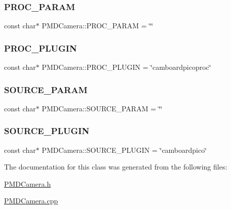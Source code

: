 \subsubsection{\texorpdfstring{P\+R\+O\+C\+\_\+\+P\+A\+R\+AM}{PROC\_PARAM}}
{\footnotesize\ttfamily const char$\ast$ P\+M\+D\+Camera\+::\+P\+R\+O\+C\+\_\+\+P\+A\+R\+AM = \char`\"{}\char`\"{}\hspace{0.3cm}{\ttfamily [private]}}

\hypertarget{class_p_m_d_camera_a1f03b40bf2336e61879fc909490f2829}{}\label{class_p_m_d_camera_a1f03b40bf2336e61879fc909490f2829} 
\subsubsection{\texorpdfstring{P\+R\+O\+C\+\_\+\+P\+L\+U\+G\+IN}{PROC\_PLUGIN}}
{\footnotesize\ttfamily const char$\ast$ P\+M\+D\+Camera\+::\+P\+R\+O\+C\+\_\+\+P\+L\+U\+G\+IN = \char`\"{}camboardpicoproc\char`\"{}\hspace{0.3cm}{\ttfamily [private]}}

\hypertarget{class_p_m_d_camera_a439b2e8f27acbc26d4de70d9f8a82386}{}\label{class_p_m_d_camera_a439b2e8f27acbc26d4de70d9f8a82386} 
\subsubsection{\texorpdfstring{S\+O\+U\+R\+C\+E\+\_\+\+P\+A\+R\+AM}{SOURCE\_PARAM}}
{\footnotesize\ttfamily const char$\ast$ P\+M\+D\+Camera\+::\+S\+O\+U\+R\+C\+E\+\_\+\+P\+A\+R\+AM = \char`\"{}\char`\"{}\hspace{0.3cm}{\ttfamily [private]}}

\hypertarget{class_p_m_d_camera_ae5c857a614ea51781c690fd862f0e7a2}{}\label{class_p_m_d_camera_ae5c857a614ea51781c690fd862f0e7a2} 
\subsubsection{\texorpdfstring{S\+O\+U\+R\+C\+E\+\_\+\+P\+L\+U\+G\+IN}{SOURCE\_PLUGIN}}
{\footnotesize\ttfamily const char$\ast$ P\+M\+D\+Camera\+::\+S\+O\+U\+R\+C\+E\+\_\+\+P\+L\+U\+G\+IN = \char`\"{}camboardpico\char`\"{}\hspace{0.3cm}{\ttfamily [private]}}



The documentation for this class was generated from the following files\+:\begin{DoxyCompactItemize}
\item 
\hyperlink{_p_m_d_camera_8h}{P\+M\+D\+Camera.\+h}\item 
\hyperlink{_p_m_d_camera_8cpp}{P\+M\+D\+Camera.\+cpp}\end{DoxyCompactItemize}
